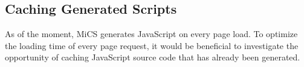 \subsection{Caching Generated Scripts} %
\label{sub:fw_script_caching}
	As of the moment, MiCS generates JavaScript on every page load. To optimize the loading time of every page request, it would be beneficial to investigate the opportunity of caching JavaScript source code that has already been generated.
